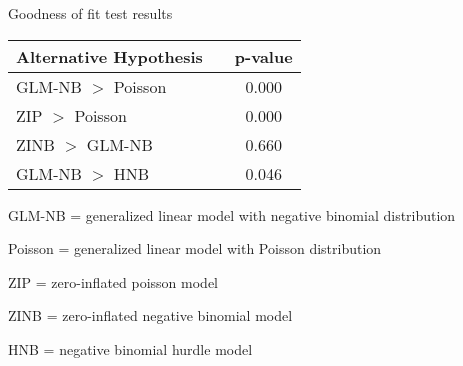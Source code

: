 \documentclass{standalone}
\begin{document}
\begin{threeparttable}
\caption{Goodness of fit test results}
\begin{tabular}{@{}lcc@{}}
  \toprule
Alternative Hypothesis & \hspace{14em} & p-value \\ 
  \midrule
GLM-NB $>$ Poisson && 0.000 \\ 
  ZIP $>$ Poisson & &0.000 \\ 
  ZINB $>$ GLM-NB && 0.660 \\ 
  GLM-NB $>$ HNB & &0.046 \\ 
   \bottomrule
\end{tabular}
\begin{tablenotes}
\small
\item GLM-NB = generalized linear model with negative binomial distribution
\item Poisson = generalized linear model with Poisson distribution 
\item ZIP = zero-inflated poisson model 
\item ZINB = zero-inflated negative binomial model 
\item HNB = negative binomial hurdle model 
\end{tablenotes}
\end{threeparttable}
\end{document}
